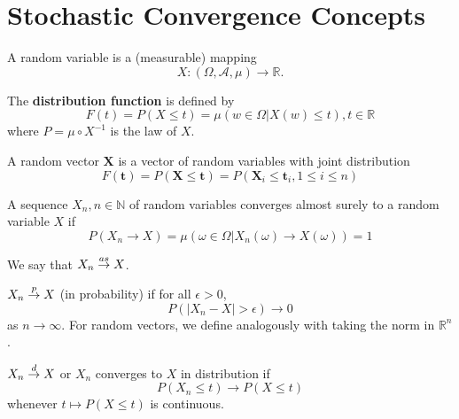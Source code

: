 \chapter{Stochastic Convergence Concepts}
\label{cha:stoch-conv-conc}

\begin{defn}
  A random variable is a (measurable) mapping $$X: (\Omega, \mathcal{A},
  \mu) \rightarrow \mathbb{R}.$$

  The \textbf{distribution function} is defined by
  \begin{equation}
    \label{eq:7}
    F(t) = P(X \leq t) = \mu(w \in \Omega | X(w) \leq t), t \in
  \mathbb{R}
  \end{equation}
  where $P = \mu \circ X^{-1}$ is the law of $X$.

  A random vector $\mathbf{X}$ is a vector of random variables with joint
  distribution
  \begin{equation}
    \label{eq:8}
F(\mathbf{t}) = P(\mathbf{X} \leq \mathbf{t}) = P(\mathbf{X}_{i} \leq \mathbf{t}_{i}, 1 \leq i \leq n)
  \end{equation}
\end{defn}

\begin{defn}
A sequence $X_{n}, n \in \mathbb{N}$ of random variables converges
almost surely to a random variable $X$ if
\begin{equation}
  \label{eq:4}
  P(X_{n} \rightarrow X) = \mu(\omega \in \Omega | X_{n}(\omega)
  \rightarrow X(\omega)) = 1
\end{equation}

We say that $X_{n} \overset{as}{\rightarrow} X$.
\end{defn}

\begin{defn}
$X_{n} \overset{p}{\rightarrow} X$ (in probability) if for all $\epsilon > 0$,
\begin{equation}
  \label{eq:5}
  P(|X_{n} - X| > \epsilon) \rightarrow 0
\end{equation} as $n \rightarrow \infty$.
For random vectors, we define analogously with taking the norm in
$\mathbb{R}^{n}$. 
\end{defn}

\begin{defn}
$X_{n} \overset{d}{\rightarrow} X$ or $X_{n}$ converges to $X$ in distribution if
\begin{equation}
  \label{eq:6}
  P(X_{n} \leq t) \rightarrow P(X \leq t)
\end{equation} whenever $t \mapsto P(X \leq t)$ is continuous.
\end{defn}

